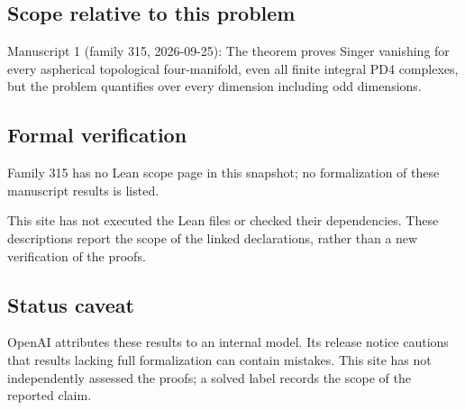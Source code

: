 \documentclass[11pt]{article}
\begin{document}
\subsection{Scope relative to this problem}
Manuscript 1 (family 315, 2026-09-25): The theorem proves Singer vanishing for every aspherical topological four-manifold, even all finite integral PD4 complexes, but the problem quantifies over every dimension including odd dimensions.

\subsection{Formal verification}
Family 315 has no Lean scope page in this snapshot; no formalization of these manuscript results is listed.

This site has not executed the Lean files or checked their dependencies. These descriptions report the scope of the linked declarations, rather than a new verification of the proofs.

\subsection{Status caveat}
OpenAI attributes these results to an internal model. Its release notice cautions that results lacking full formalization can contain mistakes. This site has not independently assessed the proofs; a solved label records the scope of the reported claim.
\end{document}
